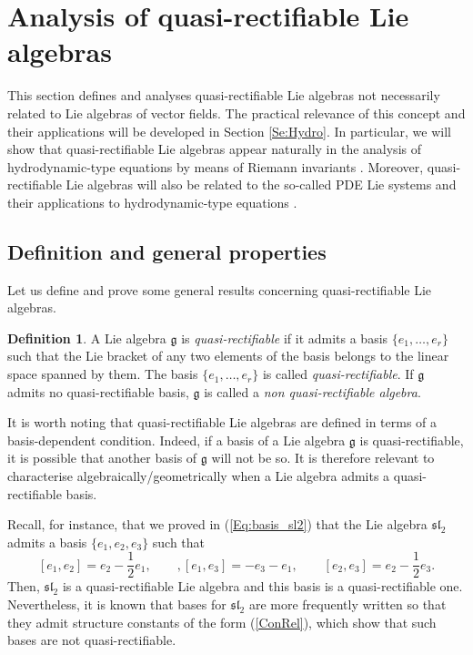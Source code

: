 \documentclass[12pt]{article}
\theoremstyle{plain}
\theoremstyle{definition}
\newtheorem{definition}[theorem]{Definition}
\numberwithin{equation}{section}
\begin{document}
 \section{Analysis of quasi-rectifiable Lie algebras}\label{Sec::ClaRecLieAlg}

This section defines and analyses quasi-rectifiable Lie algebras not necessarily related to Lie algebras of vector fields. The practical relevance of this concept and their applications will be developed in Section \ref{Se:Hydro}. In particular, we will show that quasi-rectifiable Lie algebras appear naturally in the analysis of hydrodynamic-type equations by means of Riemann invariants  \cite{Gr23,GH07}. Moreover, quasi-rectifiable Lie algebras will also be related to the so-called PDE Lie systems and their applications to hydrodynamic-type equations \cite{CGM07}. 


\subsection{Definition and general properties}
Let us  define and prove some general results concerning quasi-rectifiable Lie algebras.

\begin{definition} A Lie algebra $\mathfrak{g}$  is \textit{quasi-rectifiable} if it admits a basis $
\{e_1,\ldots,e_r\}$ such that the Lie bracket of any two elements of the basis belongs to the linear space spanned by them. The basis $\{e_1,\ldots,e_r\}$ is called {\it quasi-rectifiable}. If $\mathfrak{g}$ admits no quasi-rectifiable basis, $\mathfrak{g}$ is called a {\it non quasi-rectifiable algebra}.  
\end{definition}



It is worth noting that quasi-rectifiable Lie algebras are defined in terms of a basis-dependent condition. Indeed, if a basis of a Lie algebra $\mathfrak{g}$ is quasi-rectifiable, it is possible that another basis of $\mathfrak{g}$ will not be so. It is therefore relevant to characterise algebraically/geometrically when a Lie algebra admits a quasi-rectifiable basis.  

Recall, for instance, that we proved in (\ref{Eq:basis_sl2}) that the Lie algebra $\mathfrak{sl}_2$ admits a basis  $\{e_1,e_2,e_3\}$ such that
$$
[e_1,e_2]=e_2-\frac 12 e_1,\qquad, [e_1,e_3]=-e_3-e_1,\qquad [e_2,e_3]=e_2-\frac 12 e_3.  
$$
Then, $\mathfrak{sl}_2$ is a quasi-rectifiable Lie algebra and this basis is a quasi-rectifiable one. Nevertheless, it is known that bases for $\mathfrak{sl}_2$ are more frequently written so that they admit structure constants of the form (\ref{ConRel}), which show that such bases are not quasi-rectifiable.
\end{document}

